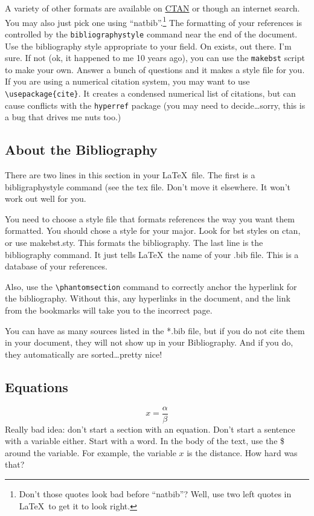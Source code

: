 \documentclass[12pt]{report}
\begin{document}
A variety of other formats are available on \href{http://www.ctan.org}{CTAN} or though an internet search. You may also just pick one using ``natbib''.\footnote{Don't those quotes look bad before ``natbib''? Well, use two left quotes in \LaTeX\ to get it to look right.}  The formatting of your references is controlled by the \verb'bibliographystyle' command near the end of the document. Use the bibliography style appropriate to your field. On exists, out there. I'm sure. If not (ok, it happened to me 10 years ago), you can use the \verb'makebst' script to make your own. Answer a bunch of questions and it makes a style file for you. If you are using a numerical citation system, you may want to use \verb'\usepackage{cite}'. It creates a condensed numerical list of citations, but can cause conflicts with the \verb'hyperref' package (you may need to decide\ldots sorry, this is a bug that drives me nuts too.)

\subsection{About the Bibliography}
There are two lines in this section in your \LaTeX\ file. The first is a bibligraphystyle command (see the \textsf{tex} file. Don't move it elsewhere. It won't work out well for you.

You need to choose a style file that formats references the way you want them formatted.  You should chose a style for your major.  Look for bst styles on ctan, or use makebst.sty. This formats the bibliography.
The last line is the bibliography command. It just tells \LaTeX\  the name of your \textsf{.bib} file. This is a database of your references.

Also, use the \verb'\phantomsection' command to correctly anchor the hyperlink for the bibliography.  Without this, any hyperlinks in the document, and the link from the bookmarks will take you to the incorrect page.

You can have as many sources listed in the *.bib file, but if you do not cite them in your document, they will not show up in your Bibliography.  And if you do, they automatically are sorted\ldots pretty nice!

\subsection{Equations}\label{sec:equations}
\begin{equation}\label{eq:alphaoverbeta} %
x=\frac{\alpha}{\beta}
\end{equation}
Really bad idea: don't start a section with an equation. Don't start a sentence with a variable either. Start with a word. In the body of the text, use the \$ around the variable.  For example, the variable $x$ is the distance. How hard was that?
\end{document}

